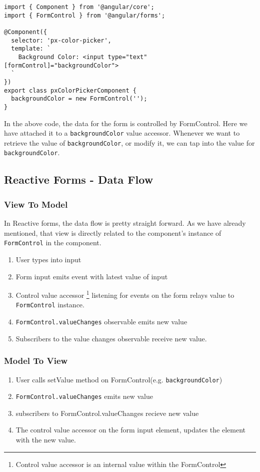 \begin{lstlisting}
import { Component } from '@angular/core';
import { FormControl } from '@angular/forms';
  
@Component({
  selector: 'px-color-picker',
  template: `
    Background Color: <input type="text" [formControl]="backgroundColor">
  `
})
export class pxColorPickerComponent {
  backgroundColor = new FormControl('');
}
\end{lstlisting}

In the above code, the data for the form is controlled by FormControl. Here we
have attached it to a \lstinline{backgroundColor} value accessor. Whenever we 
want to retrieve the value of \lstinline{backgroundColor}, or modify it, we 
can tap into the value for \lstinline{backgroundColor}. 

\subsection{ Reactive Forms - Data Flow }

\subsubsection{View To Model}
In Reactive forms, the data flow is pretty straight forward. As we have already
mentioned, that view is directly related to the component's instance of 
\lstinline{FormControl} in the component. 
\begin{enumerate}
  \item User types into input
  \item Form input emits event with latest value of input
  \item Control value accessor \footnote{Control value accessor is an internal value within the 
  FormControl} listening for events on the form relays value 
  to \lstinline{FormControl} instance. 
  \item \lstinline{FormControl.valueChanges} observable emits new value 
  \item Subscribers to the value changes observable receive new value. 
\end{enumerate}

\subsubsection{ Model To View }
\begin{enumerate}
  \item User calls setValue method on FormControl(e.g. \lstinline{backgroundColor})
  \item \lstinline{FormControl.valueChanges} emits new value
  \item subscribers to FormControl.valueChanges recieve new value
  \item The control value accessor on the form input element, updates the 
  element with the new value. 
\end{enumerate}

